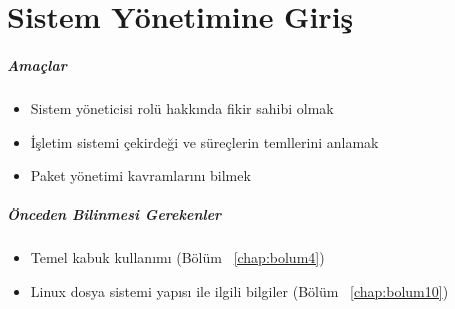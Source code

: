 \chapter{Sistem Yönetimine Giriş}
\label{chap:bolum12}
\paragraph{Amaçlar}{
\begin{itemize}
\item Sistem yöneticisi rolü hakkında fikir sahibi olmak
\item İşletim sistemi çekirdeği ve süreçlerin temllerini anlamak
\item Paket yönetimi kavramlarını bilmek
\end{itemize}
}
\paragraph{Önceden Bilinmesi Gerekenler}{
\begin{itemize}
 \item Temel kabuk kullanımı (Bölüm ~\ref{chap:bolum4})
 \item Linux dosya sistemi yapısı ile ilgili bilgiler (Bölüm ~\ref{chap:bolum10})
 \end{itemize}
} 
 
